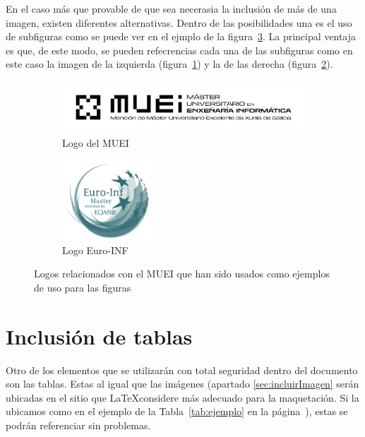 En el caso más que provable de que sea necerasia la inclusión de más de una imagen, 
existen diferentes alternativas. Dentro de las posibilidades una es el uso de 
subfiguras como se puede ver en el ejmplo de la figura~\ref{fig:ejemplo-subfiguras}.
La principal ventaja es que, de este modo, se pueden refecrencias cada una de las subfiguras 
como en este caso la imagen de la izquierda (figura~\ref{fig:subfigura-rotada}) y la 
de las derecha (figura~\ref{fig:subfigura-deformada}). 

\begin{figure}[hp!]
  \centering
  \begin{subfigure}[c]{0.3\textwidth}
    \includegraphics[angle=45,width=\textwidth]{06_imagenes/MUEI.png}
    \caption{Logo del MUEI}
    \label{fig:subfigura-rotada}
  \end{subfigure}
  \hspace{0.1\textwidth}
  \begin{subfigure}[c]{0.3\textwidth}
    \includegraphics[width=\textwidth,height=3cm]{06_imagenes/euro_inf_master_verde.png}
    \caption{Logo Euro-INF}
    \label{fig:subfigura-deformada}
  \end{subfigure}
  \caption{Logos relacionados con el MUEI que han sido usados como ejemplos de uso para las figuras}
  \label{fig:ejemplo-subfiguras}
\end{figure}

\section{Inclusión de tablas}\label{sec:tablas}

Otro de los elementos que se utilizarán con total seguridad dentro 
del documento son las tablas. Estas al igual que las imágenes (apartado 
\ref{sec:incluirImagen} serán ubicadas en el sitio que \LaTeX considere más adecuado 
para la maquetación. Si la ubicamos como en el ejemplo de la Tabla~\ref{tab:ejemplo} en 
la página~\pageref{tab:ejemplo}), estas se podrán referenciar sin problemas. 

